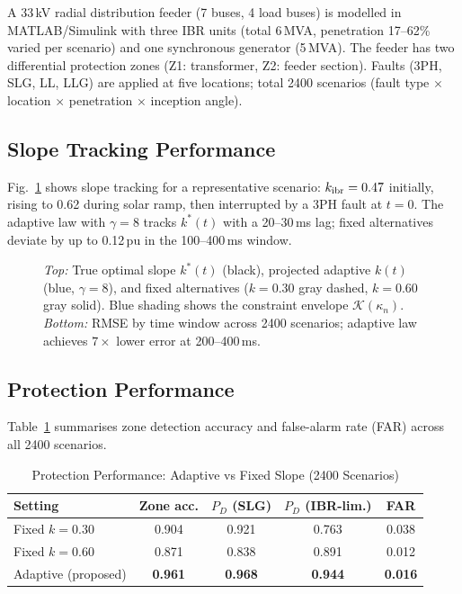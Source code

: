 \documentclass[journal]{IEEEtran}
\newcommand{\kibr}{k_{\rm ibr}}
\newcommand{\kappan}{\kappa_{n}}
\newcommand{\kstar}{k^*}
\newcommand{\calK}{\mathcal{K}}
\begin{document}
A 33\,kV radial distribution feeder (7 buses, 4 load buses) is modelled
in MATLAB/Simulink with three IBR units (total 6\,MVA, penetration
17--62\% varied per scenario) and one synchronous generator (5\,MVA).
The feeder has two differential protection zones (Z1: transformer,
Z2: feeder section).  Faults (3PH, SLG, LL, LLG) are applied at
five locations; total 2400 scenarios (fault type $\times$ location
$\times$ penetration $\times$ inception angle).

\subsection{Slope Tracking Performance}

Fig.~\ref{fig:slope_track} shows slope tracking for a representative
scenario: $\kibr = 0.47$ initially, rising to 0.62 during solar ramp,
then interrupted by a 3PH fault at $t = 0$.  The adaptive law with
$\gamma = 8$ tracks $\kstar(t)$ with a 20--30\,ms lag; fixed
alternatives deviate by up to 0.12\,pu in the 100--400\,ms window.

\begin{figure}[!t]
  \centering
  
  \caption{\emph{Top:} True optimal slope $\kstar(t)$ (black),
           projected adaptive $k(t)$ (blue, $\gamma=8$), and fixed
           alternatives ($k=0.30$ gray dashed, $k=0.60$ gray solid).
           Blue shading shows the constraint envelope $\calK(\kappan)$.
           \emph{Bottom:} RMSE by time window across 2400 scenarios;
           adaptive law achieves $7\times$ lower error at 200--400\,ms.}
  \label{fig:slope_track}
\end{figure}

\subsection{Protection Performance}

Table~\ref{tab:perf} summarises zone detection accuracy and false-alarm
rate (FAR) across all 2400 scenarios.

\begin{table}[!t]
  \caption{Protection Performance: Adaptive vs Fixed Slope (2400 Scenarios)}
  \label{tab:perf}
  \centering\small
  \begin{tabular}{@{}lcccc@{}}
    \toprule
    Setting & Zone acc. & $P_D$ (SLG) & $P_D$ (IBR-lim.) & FAR \\
    \midrule
    Fixed $k=0.30$ & 0.904 & 0.921 & 0.763 & 0.038 \\
    Fixed $k=0.60$ & 0.871 & 0.838 & 0.891 & 0.012 \\
    Adaptive (proposed) & \textbf{0.961} & \textbf{0.968} & \textbf{0.944} & \textbf{0.016} \\
    \bottomrule
  \end{tabular}
\end{table}
\end{document}
